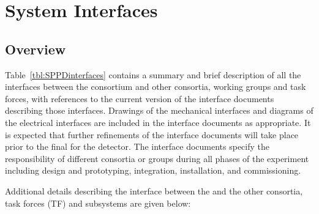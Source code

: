 \section{System Interfaces}
\label{sec:fdsp-pd-intfc}


\subsection{Overview}
Table~\ref{tbl:SPPDinterfaces} contains a summary and brief description of all the interfaces between the   consortium and other consortia, working groups and task forces, with references to the current version of the interface documents describing those interfaces.  
Drawings of the mechanical interfaces and diagrams of the electrical interfaces are 
included in the interface documents as appropriate.
It is expected that further refinements of the interface documents will take place prior to the final  for the detector. The interface documents specify the responsibility of different consortia or groups during all phases of the experiment including design and prototyping, integration,  installation, and  commissioning.



Additional details describing the interface between the   and the other consortia, task forces (TF) and subsystems are given below:

